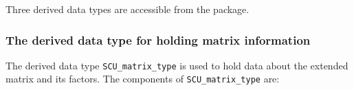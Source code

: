 \documentclass{galahad}
\newcommand{\packagename}{SCU}
\begin{document}




\galtypes
Three derived data types are accessible from the package.


\subsubsection{The derived data type for holding matrix information}
\label{typematrix}
The derived data type {\tt \packagename\_matrix\_type} is used to hold 
data about the extended matrix and its factors. The components of 
{\tt \packagename\_matrix\_type} 
are:
\end{document}
